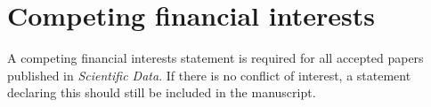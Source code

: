 \section{Competing financial interests}

A competing financial interests statement is required for all accepted papers published in \textit{Scientific Data}. If there is no conflict of interest, a statement declaring this should still be included in the manuscript.